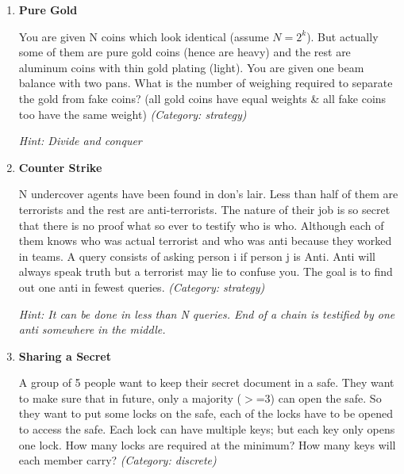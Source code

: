 \begin{enumerate}

\item \textbf{Pure Gold}

You are given N coins which look identical (assume $N = 2^k$). But actually some of them are pure gold coins (hence are heavy) and the rest are aluminum coins with thin gold plating (light). You are given one beam balance with two pans. What is the number of weighing required to separate the gold from fake coins? (all gold coins have equal weights \& all fake coins too have the same weight)
\small\emph{(Category: strategy)}

\small\emph{Hint: Divide and conquer}





\item \textbf{Counter Strike}

N undercover agents have been found in don's lair. Less than half of them are terrorists and the rest are anti-terrorists. The nature of their job is so secret that there is no proof what so ever to testify who is who. Although each of them knows who was actual terrorist and who was anti because they worked in teams. A query consists of asking person i if person j is Anti. Anti will always speak truth but a terrorist may lie to confuse you. The goal is to find out one anti in fewest queries.
\small\emph{(Category: strategy)}

\small\emph{Hint: It  can be done in less than N queries. End of a chain is testified by one anti somewhere in the middle.}





\item \textbf{Sharing a Secret}

A group of 5 people want to keep their secret document in a safe. They want to make sure that in future, only a majority ($>$=3) can open the safe. So they want to put some locks on the safe, each of the locks have to be opened to access the safe. Each lock can have multiple keys; but each key only opens one lock. How many locks are required at the minimum? How many keys will each member carry?
\small\emph{(Category: discrete)}


\end{enumerate}

